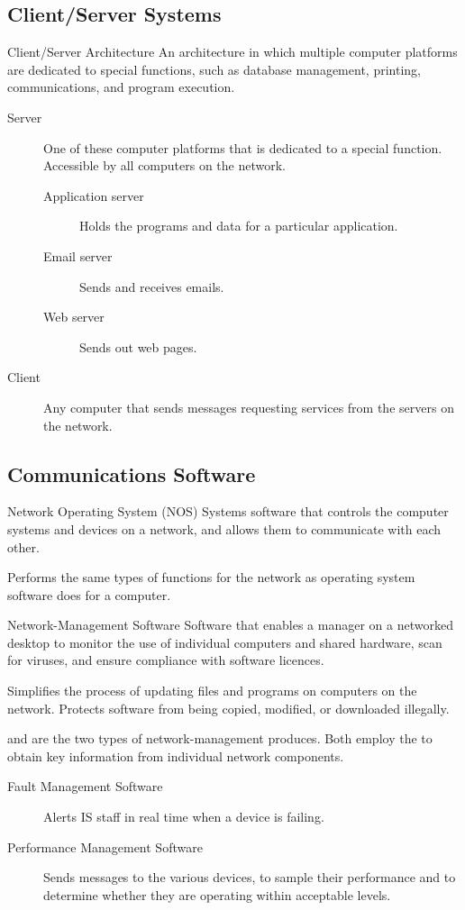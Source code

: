 \documentclass[\main/notes.tex]{subfiles}
\begin{document}
			\subsection{Client/Server Systems}
				\begin{definition}{Client/Server Architecture}
					An architecture in which multiple computer platforms are dedicated to special functions, such as database management, printing, communications, and program execution.
					\begin{description}
						\item[Server] One of these computer platforms that is dedicated to a special function. Accessible by all computers on the network.
							\begin{description}
								\item[Application server] Holds the programs and data for a particular application.
								\item[Email server] Sends and receives emails.
								\item[Web server] Sends out web pages.
							\end{description}
						\item[Client] Any computer that sends messages requesting services from the servers on the network.
					\end{description}
				\end{definition}
			\subsection{Communications Software}
				\begin{definition}{Network Operating System (NOS)}
					Systems software that controls the computer systems and devices on a network, and allows them to communicate with each other.

					Performs the same types of functions for the network as operating system software does for a computer.
				\end{definition}
				\pagebreak
				\begin{definition}{Network-Management Software}
					Software that enables a manager on a networked desktop to monitor the use of individual computers and shared hardware, scan for viruses, and ensure compliance with software licences.

					Simplifies the process of updating files and programs on computers on the network. Protects software from being copied, modified, or downloaded illegally.

					 and  are the two types of network-management produces. Both employ the  to obtain key information from individual network components.
					\begin{description}
						\item[Fault Management Software] Alerts IS staff in real time when a device is failing.
						\item[Performance Management Software] Sends messages to the various devices, to sample their performance and to determine whether they are operating within acceptable levels.
					\end{description}
				\end{definition}
\end{document}
